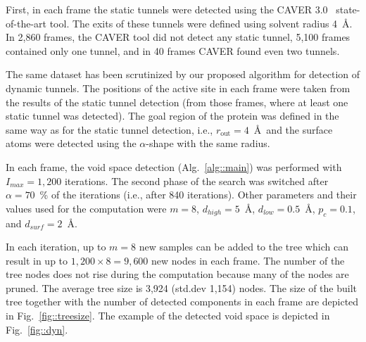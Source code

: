 \documentclass[usletter, 10pt, conference]{svjour3}      %
\def\Imax{I_{max}} %
\def\dts{d_{surf}}
\def\da{d_{high}}
\def\db{d_{low}}
\def\gprobe{r_{\mathrm{out}}}
\def\gb{p_{c}}
\begin{document}
First, in each frame the static tunnels were detected using the CAVER 3.0~\cite{caver3} state-of-the-art tool.
The exits of these tunnels were defined using solvent radius 4~\AA.
In 2,860 frames, the CAVER tool did not detect any static tunnel, 5,100 frames contained only one tunnel, and in 40 frames CAVER found even two tunnels.

The same dataset has been scrutinized by our proposed algorithm for detection of dynamic tunnels.
The positions of the active site in each frame were taken from the results of the static tunnel detection (from those frames, where at least
one static tunnel was detected).
The goal region of the protein was defined in the same way as for the static tunnel detection, i.e., $\gprobe=4$~\AA\ and 
the surface atoms were detected using the $\alpha$-shape with the same radius.

In each frame, the void space detection (Alg.~\ref{alg::main}) was performed with $\Imax=1,200$ iterations.
The second phase of the search was switched after $\alpha=70$~\% of the iterations (i.e., after 840 iterations).
Other parameters and their values used for the computation were $m=8$, $\da=5$~\AA, $\db=0.5$~\AA, $\gb=0.1$, and $\dts=2$~\AA.

In each iteration, up to $m=8$ new samples can be added to the tree which can result in up to $1,200 \times 8 = 9,600$ new nodes in each frame. 
The number of the tree nodes does not rise during the computation because many of the nodes are pruned.
The average tree size is 3,924 (std.dev 1,154) nodes.
The size of the built tree together with the number of detected components in each frame are depicted in Fig.~\ref{fig::treesize}.
The example of the detected void space is depicted in Fig.~\ref{fig::dyn}.
\end{document}
